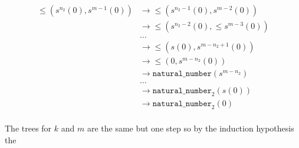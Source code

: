 \documentclass{article}
\newcommand{\n}{\texttt{natural\_number}}
\begin{document}
\[
   \begin{aligned}
      \le(s^{n_2}(0), s^{m-1}(0)) & \longrightarrow \le(s^{n_2-1}(0), s^{m-2}(0)) \\
         & \longrightarrow  \le(s^{n_2-2}(0), \le s^{m-3}(0)) \\
         & \ldots \\
         & \longrightarrow \le(s(0), s^{m-n_2+1}(0)) \\
         & \longrightarrow \le(0,  s^{m-n_2}(0)) \\
         & \longrightarrow \n(s^{m-n_2}) \\
         & \ldots \\
         & \longrightarrow \n_2(s(0)) \\
         & \longrightarrow \n_2(0) \\
   \end{aligned}
\]

The trees for $k$ and $m$ are the same but one step so by the induction
hypothesis the 
\end{document}
